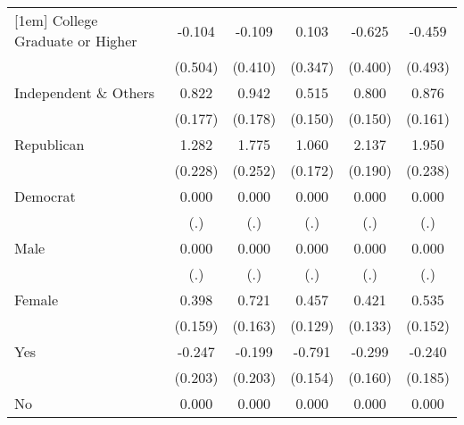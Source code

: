 \begin{table}[htbp]
\begin{tabular}{l*{5}{c}}
[1em]
College Graduate or Higher&      -0.104         &      -0.109         &       0.103         &      -0.625         &      -0.459         \\
                    &     (0.504)         &     (0.410)         &     (0.347)         &     (0.400)         &     (0.493)         \\
[1em]
Independent \& Others&       0.822\sym{***}&       0.942\sym{***}&       0.515\sym{***}&       0.800\sym{***}&       0.876\sym{***}\\
                    &     (0.177)         &     (0.178)         &     (0.150)         &     (0.150)         &     (0.161)         \\
[1em]
Republican          &       1.282\sym{***}&       1.775\sym{***}&       1.060\sym{***}&       2.137\sym{***}&       1.950\sym{***}\\
                    &     (0.228)         &     (0.252)         &     (0.172)         &     (0.190)         &     (0.238)         \\
[1em]
Democrat            &       0.000         &       0.000         &       0.000         &       0.000         &       0.000         \\
                    &         (.)         &         (.)         &         (.)         &         (.)         &         (.)         \\
[1em]
Male                &       0.000         &       0.000         &       0.000         &       0.000         &       0.000         \\
                    &         (.)         &         (.)         &         (.)         &         (.)         &         (.)         \\
[1em]
Female              &       0.398\sym{**} &       0.721\sym{***}&       0.457\sym{***}&       0.421\sym{***}&       0.535\sym{***}\\
                    &     (0.159)         &     (0.163)         &     (0.129)         &     (0.133)         &     (0.152)         \\
[1em]
Yes                 &      -0.247         &      -0.199         &      -0.791\sym{***}&      -0.299\sym{*}  &      -0.240         \\
                    &     (0.203)         &     (0.203)         &     (0.154)         &     (0.160)         &     (0.185)         \\
[1em]
No                  &       0.000         &       0.000         &       0.000         &       0.000         &       0.000         \\

\end{tabular}
\end{table}
